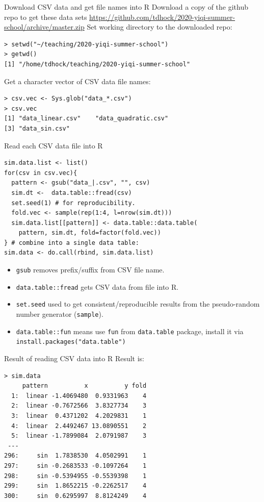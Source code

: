 \documentclass[12pt]{article}
\begin{document}
{Download CSV data and get file names into R}
Download a copy of the github repo to get these data sets
\url{https://github.com/tdhock/2020-yiqi-summer-school/archive/master.zip}
Set working directory to the downloaded repo:
\begin{verbatim}
> setwd("~/teaching/2020-yiqi-summer-school")
> getwd()
[1] "/home/tdhock/teaching/2020-yiqi-summer-school"
\end{verbatim}
  Get a character vector of CSV data file names:
\begin{verbatim}
> csv.vec <- Sys.glob("data_*.csv")
> csv.vec
[1] "data_linear.csv"    "data_quadratic.csv"
[3] "data_sin.csv"      
\end{verbatim}

{Read each CSV data file into R}
\begin{verbatim}
sim.data.list <- list()
for(csv in csv.vec){
  pattern <- gsub("data_|.csv", "", csv)
  sim.dt <-  data.table::fread(csv)
  set.seed(1) # for reproducibility.
  fold.vec <- sample(rep(1:4, l=nrow(sim.dt)))
  sim.data.list[[pattern]] <- data.table::data.table(
    pattern, sim.dt, fold=factor(fold.vec))
} # combine into a single data table:
sim.data <- do.call(rbind, sim.data.list)
\end{verbatim}
\begin{itemize}
\item \texttt{gsub} removes prefix/suffix from CSV file name.
\item \texttt{data.table::fread} gets CSV data from file into R.
\item \texttt{set.seed} used to get consistent/reproducible results from the
  pseudo-random number generator (\texttt{sample}).
\item \texttt{data.table::fun} means use \texttt{fun} from
  \texttt{data.table} package, install it via
  \texttt{install.packages("data.table")}
\end{itemize}

{Result of reading CSV data into R}
  Result is:
\begin{verbatim}
> sim.data
     pattern          x          y fold
  1:  linear -1.4069480  0.9331963    4
  2:  linear -0.7672566  3.8327734    3
  3:  linear  0.4371202  4.2029831    1
  4:  linear  2.4492467 13.0890551    2
  5:  linear -1.7899084  2.0791987    3
 ---                                   
296:     sin  1.7838530  4.0502991    1
297:     sin -0.2683533 -0.1097264    1
298:     sin -0.5394955 -0.5539398    1
299:     sin  1.8652215 -0.2262517    4
300:     sin  0.6295997  8.8124249    4
\end{verbatim}
\end{document}
